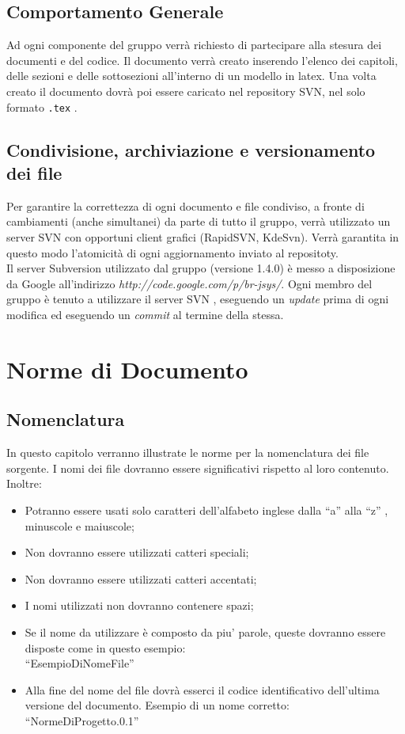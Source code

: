 \documentclass[11pt,titlepage,a4paper]{report}
\begin{document}
\section{Comportamento Generale}
Ad ogni componente del gruppo verr\`a richiesto di partecipare alla stesura dei documenti e del codice. Il documento verr\`a creato inserendo l'elenco dei capitoli, delle sezioni e delle sottosezioni all'interno di un modello in latex. Una volta creato il documento dovr\`a poi essere caricato nel repository SVN, nel solo formato \texttt{.tex} .
\section[Condivisione dei file]{Condivisione, archiviazione e versionamento dei file}
Per garantire la correttezza di ogni documento e file condiviso, a fronte di cambiamenti (anche simultanei) da parte di tutto il gruppo, verr\`a  utilizzato un server SVN con opportuni client grafici (RapidSVN, KdeSvn). Verr\`a garantita in questo modo l'atomicit\`a di ogni aggiornamento inviato al repositoty.\\ 
Il server Subversion utilizzato dal gruppo (versione 1.4.0) \`e messo a disposizione da Google all'indirizzo \textit{http://code.google.com/p/br-jsys/}.
\newline
 \newline
Ogni membro del gruppo \`e tenuto a utilizzare il server SVN , eseguendo un \textit{update} prima di ogni modifica ed eseguendo un \textit{commit} al termine della stessa.

\chapter{Norme di Documento}
\section{Nomenclatura}
In questo capitolo verranno illustrate le norme per la nomenclatura dei file sorgente. I nomi dei file dovranno essere significativi rispetto al loro contenuto. Inoltre:
\begin{itemize}
\item Potranno essere usati solo caratteri dell'alfabeto inglese dalla ``a'' alla ``z'' , minuscole e maiuscole;
\item Non dovranno essere utilizzati catteri speciali;
\item Non dovranno essere utilizzati catteri accentati;
\item I nomi utilizzati non dovranno contenere spazi;
\item Se il nome da utilizzare \`e composto da piu' parole, queste dovranno essere disposte come in questo esempio: \\
``EsempioDiNomeFile''
\item Alla fine del nome del file dovr\`a esserci il codice identificativo dell'ultima versione del documento.
Esempio di un nome corretto:\\
``NormeDiProgetto.0.1''
\end{itemize}
\end{document}
